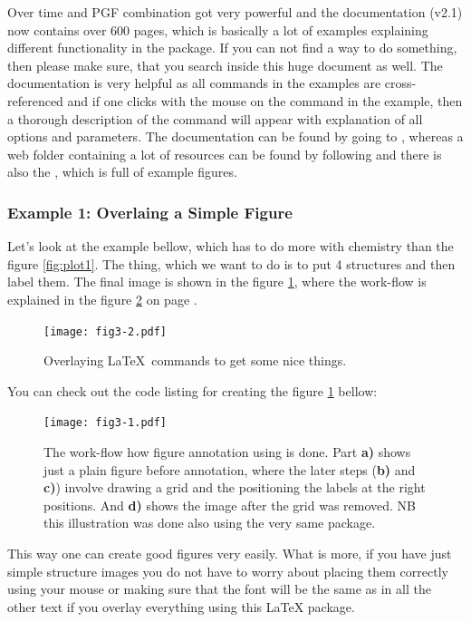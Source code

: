 \documentclass[
]{scrartcl}
\begin{document}
%
Over time  and PGF combination got very powerful and the documentation
    (v2.1) now contains over 600 pages, which is basically a lot of examples
    explaining different functionality in the package.
%
If you can not find a way to do something, then please make sure, that you
    search inside this huge document as well.
%
The documentation is very helpful as all commands in the examples are
    cross-referenced and if one clicks with the mouse on the command in the
    example, then a thorough description of the command will appear with
    explanation of all options and parameters.
%
The documentation can be found by going to
    , whereas a web folder containing a lot of resources can be found by
    following  and there is also the , which
    is full of  example figures.

%
\clearpage
\subsubsection{Example 1: Overlaing a Simple Figure}

%
Let's look at the example bellow, which has to do more with chemistry than the
    figure \ref{fig:plot1}.
%
The thing, which we want to do is to put 4 structures and then label them.
%
The final image is shown in the figure \ref{fig:struct1}, where the work-flow
    is explained in the figure \ref{fig:struct1multi} on page
    \pageref{fig:struct1multi}.

%
\begin{figure}[h]
    \centering
    \texttt{[image: fig3-2.pdf]}
    \caption{Overlaying \LaTeX\ commands to get some nice things.}
    \label{fig:struct1}
\end{figure}

%
You can check out the code listing for creating the figure \ref{fig:struct1}
    bellow:
    

%
\begin{figure}[h]
    \centering
    \texttt{[image: fig3-1.pdf]}
    \caption{
    The work-flow how figure annotation using  is done.
    Part \textbf{a)} shows just a plain figure before annotation, where the
        later steps (\textbf{b)} and \textbf{c)}) involve drawing a grid and the
        positioning the labels at the right positions.
    And \textbf{d)} shows the image after the grid was removed.
    NB this illustration was done also using the very same  package.}
    \label{fig:struct1multi} 
\end{figure}
%
This way one can create good figures very easily.
%
What is more, if you have just simple structure images you do not have to worry
    about placing them correctly using your mouse or making sure that the font
    will be the same as in all the other text if you overlay everything using
    this \LaTeX{} package.
\end{document}
